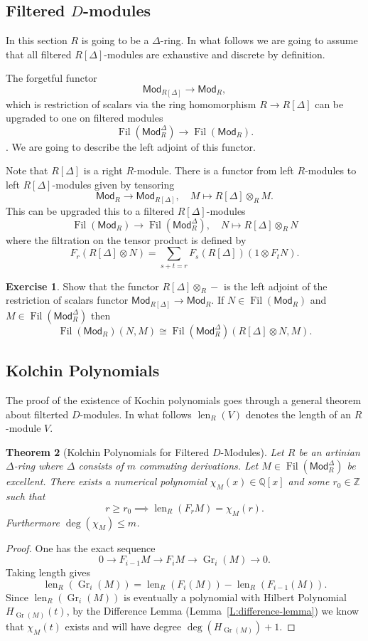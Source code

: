 \documentclass[12pt]{book}
\numberwithin{equation}{section}
\newtheorem{theorem}{Theorem}[subsection]
\theoremstyle{definition}
\newtheorem{exercise}[theorem]{Exercise}
\theoremstyle{remark}
\newcommand{\ZZ}{\mathbb{Z}}
\newcommand{\QQ}{\mathbb{Q}}
\newcommand{\Mod}{\mathsf{Mod}}
\newcommand{\Fil}{\operatorname{Fil}}
\newcommand{\len}{\operatorname{len}}
\newcommand{\Gr}{\operatorname{Gr}}
\begin{document}
\subsection{Filtered $D$-modules}
In this section $R$ is going to be a $\Delta$-ring. 
In what follows we are going to assume that all filtered $R[\Delta]$-modules are exhaustive and discrete by definition.

The forgetful functor 
$$\Mod_{R[\Delta]} \to \Mod_R, $$ 
which is restriction of scalars via the ring homomorphism $R\to R[\Delta]$ can be upgraded to one on filtered modules 
$$\Fil(\Mod^{\Delta}_R) \to \Fil(\Mod_R).$$.
We are going to describe the left adjoint of this functor. 

Note that $R[\Delta]$ is a right $R$-module. 
There is a functor from left $R$-modules to left $R[\Delta]$-modules given by tensoring
$$ \Mod_R \to \Mod_{R[\Delta]}, \quad M \mapsto R[\Delta] \otimes_R M.$$
This can be upgraded this to a filtered $R[\Delta]$-modules 
$$\Fil(\Mod_R) \to \Fil(\Mod_R^{\Delta}), \quad N \mapsto R[\Delta]\otimes_R N$$
where the filtration on the tensor product is defined by
$$ F_r( R[\Delta]\otimes N) = \sum_{s+t=r} F_s(R[\Delta])(1 \otimes F_t N). $$

\begin{exercise}
	Show that the functor $R[\Delta]\otimes_R -$ is the left adjoint of the restriction of scalars functor $\Mod_{R[\Delta]} \to \Mod_R$.
	If $N \in \Fil(\Mod_R)$ and $M \in \Fil(\Mod_R^{\Delta})$ then 
	$$ \Fil(\Mod_R)(N,M) \cong \Fil(\Mod_R^{\Delta})(R[\Delta]\otimes N, M).$$
\end{exercise}

\subsection{Kolchin Polynomials}

The proof of the existence of Kochin polynomials goes through a general theorem about filterted $D$-modules. 
In what follows $\len_R(V)$ denotes the length of an $R$-module $V$. 
\begin{theorem}[Kolchin Polynomials for Filtered $D$-Modules]
	Let $R$ be an artinian $\Delta$-ring where $\Delta$ consists of $m$ commuting derivations. 
	Let $M \in \Fil(\Mod_R^{\Delta})$ be excellent. 
	There exists a numerical polynomial $\chi_M(x) \in \QQ[x]$ and some $r_0 \in \ZZ$ such that 
	$$ r \geq r_0 \implies \len_R(F_rM) = \chi_M(r). $$
	Furthermore $\deg(\chi_M) \leq m$. 
\end{theorem}
\begin{proof}
	One has the exact sequence 
	$$0 \to F_{i-1}M \to F_i M \to \Gr_i(M) \to 0. $$ 
	Taking length gives 
	$$ \len_R(\Gr_i(M)) = \len_R(F_i(M)) - \len_R(F_{i-1}(M)).$$
	Since $\len_R(\Gr_i(M))$ is eventually a polynomial with Hilbert Polynomial $H_{\Gr(M)}(t)$, by the Difference Lemma (Lemma~\ref{L:difference-lemma}) we know that $\chi_M(t)$ exists and will have degree $\deg( H_{\Gr(M)}) +1$.
\end{proof}
\end{document}
